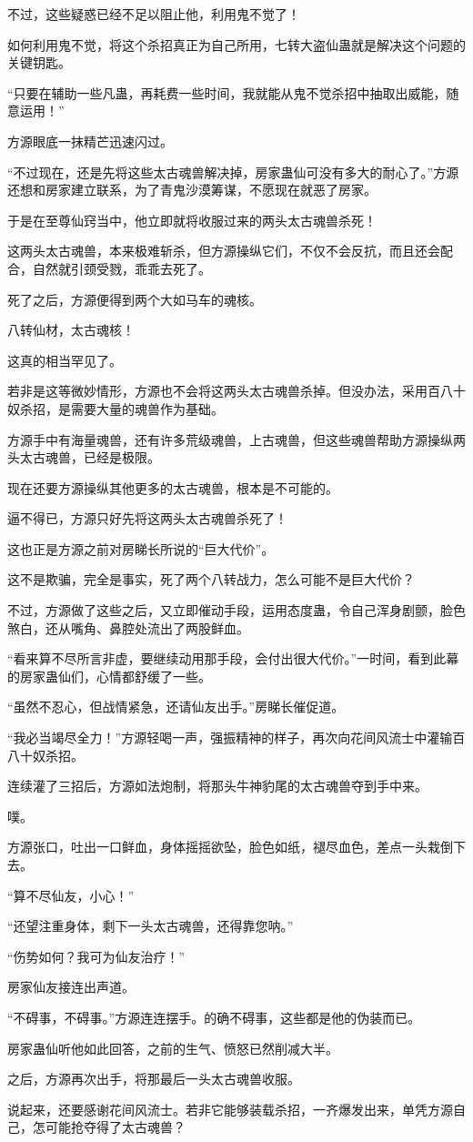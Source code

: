 \begin{this_body}
不过，这些疑惑已经不足以阻止他，利用鬼不觉了！

如何利用鬼不觉，将这个杀招真正为自己所用，七转大盗仙蛊就是解决这个问题的关键钥匙。

“只要在辅助一些凡蛊，再耗费一些时间，我就能从鬼不觉杀招中抽取出威能，随意运用！”

方源眼底一抹精芒迅速闪过。

“不过现在，还是先将这些太古魂兽解决掉，房家蛊仙可没有多大的耐心了。”方源还想和房家建立联系，为了青鬼沙漠筹谋，不愿现在就恶了房家。

于是在至尊仙窍当中，他立即就将收服过来的两头太古魂兽杀死！

这两头太古魂兽，本来极难斩杀，但方源操纵它们，不仅不会反抗，而且还会配合，自然就引颈受戮，乖乖去死了。

死了之后，方源便得到两个大如马车的魂核。

八转仙材，太古魂核！

这真的相当罕见了。

若非是这等微妙情形，方源也不会将这两头太古魂兽杀掉。但没办法，采用百八十奴杀招，是需要大量的魂兽作为基础。

方源手中有海量魂兽，还有许多荒级魂兽，上古魂兽，但这些魂兽帮助方源操纵两头太古魂兽，已经是极限。

现在还要方源操纵其他更多的太古魂兽，根本是不可能的。

逼不得已，方源只好先将这两头太古魂兽杀死了！

这也正是方源之前对房睇长所说的“巨大代价”。

这不是欺骗，完全是事实，死了两个八转战力，怎么可能不是巨大代价？

不过，方源做了这些之后，又立即催动手段，运用态度蛊，令自己浑身剧颤，脸色煞白，还从嘴角、鼻腔处流出了两股鲜血。

“看来算不尽所言非虚，要继续动用那手段，会付出很大代价。”一时间，看到此幕的房家蛊仙们，心情都舒缓了一些。

“虽然不忍心，但战情紧急，还请仙友出手。”房睇长催促道。

“我必当竭尽全力！”方源轻喝一声，强振精神的样子，再次向花间风流士中灌输百八十奴杀招。

连续灌了三招后，方源如法炮制，将那头牛神豹尾的太古魂兽夺到手中来。

噗。

方源张口，吐出一口鲜血，身体摇摇欲坠，脸色如纸，褪尽血色，差点一头栽倒下去。

“算不尽仙友，小心！”

“还望注重身体，剩下一头太古魂兽，还得靠您呐。”

“伤势如何？我可为仙友治疗！”

房家仙友接连出声道。

“不碍事，不碍事。”方源连连摆手。的确不碍事，这些都是他的伪装而已。

房家蛊仙听他如此回答，之前的生气、愤怒已然削减大半。

之后，方源再次出手，将那最后一头太古魂兽收服。

说起来，还要感谢花间风流士。若非它能够装载杀招，一齐爆发出来，单凭方源自己，怎可能抢夺得了太古魂兽？

\end{this_body}

